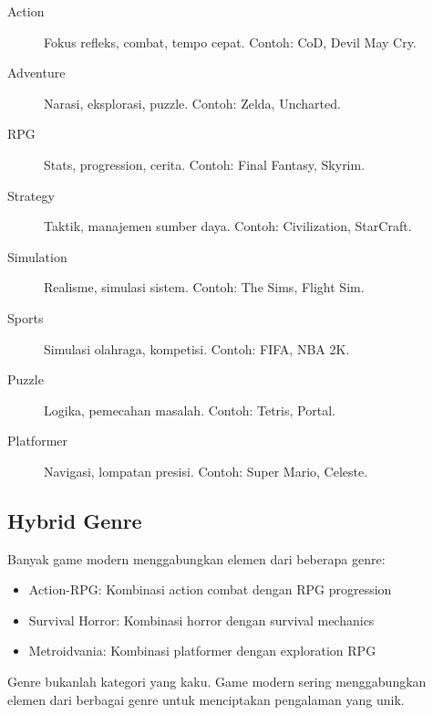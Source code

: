 \begin{description}
    \item[Action] Fokus refleks, combat, tempo cepat. Contoh: CoD, Devil May Cry.
    \item[Adventure] Narasi, eksplorasi, puzzle. Contoh: Zelda, Uncharted.
    \item[RPG] Stats, progression, cerita. Contoh: Final Fantasy, Skyrim.
    \item[Strategy] Taktik, manajemen sumber daya. Contoh: Civilization, StarCraft.
    \item[Simulation] Realisme, simulasi sistem. Contoh: The Sims, Flight Sim.
    \item[Sports] Simulasi olahraga, kompetisi. Contoh: FIFA, NBA 2K.
    \item[Puzzle] Logika, pemecahan masalah. Contoh: Tetris, Portal.
    \item[Platformer] Navigasi, lompatan presisi. Contoh: Super Mario, Celeste.
\end{description}

\subsection{Hybrid Genre}

Banyak game modern menggabungkan elemen dari beberapa genre:
\begin{itemize}
\item Action-RPG: Kombinasi action combat dengan RPG progression
\item Survival Horror: Kombinasi horror dengan survival mechanics
\item Metroidvania: Kombinasi platformer dengan exploration RPG
\end{itemize}

\begin{catatan}
Genre bukanlah kategori yang kaku. Game modern sering menggabungkan elemen dari berbagai genre untuk menciptakan pengalaman yang unik.
\end{catatan}
